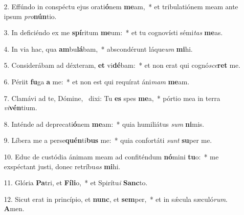 2. Effúndo in conspéctu ejus orati\textbf{ó}nem \textbf{me}am,~*  et tribulatiónem meam ante ipsum \textit{pro}\textbf{nún}tio.\

3. In deficiéndo ex me \textbf{spí}ritum \textbf{me}um:~*  et tu cognovísti sémi\textit{tas} \textbf{me}as.\

4. In via hac, qua \textbf{am}bu\textbf{lá}bam,~*  abscondérunt láque\textit{um} \textbf{mi}hi.\

5. Considerábam ad déxteram, \textbf{et} vi\textbf{dé}bam:~*  et non erat qui cognó\textit{sce}\textbf{ret} me.\

6. Périit \textbf{fu}ga \textbf{a} me:~*  et non est qui requírat áni\textit{mam} \textbf{me}am.\

7. Clamávi ad te, Dómine, \dag\  dixi: Tu \textbf{es} spes \textbf{me}a,~*  pórtio mea in terra \textit{vi}\textbf{vén}tium.\

8. Inténde ad deprecati\textbf{ó}nem \textbf{me}am:~*  quia humiliátus \textit{sum} \textbf{ni}mis.\

9. Líbera me a perse\textbf{quén}ti\textbf{bus} me:~*  quia confortáti \textit{sunt} \textbf{su}per me.\

10. Educ de custódia ánimam meam ad confiténdum \textbf{nó}mini \textbf{tu}o:~*  me exspéctant justi, donec retríbu\textit{as} \textbf{mi}hi.\

11. Glória \textbf{Pa}tri, et \textbf{Fí}\textbf{li}o,~*  et Spirítu\textit{i} \textbf{Sanc}to.\

12. Sicut erat in princípio, et \textbf{nunc}, et \textbf{sem}per,~*  et in sǽcula sæculó\textit{rum}. \textbf{A}men.\

